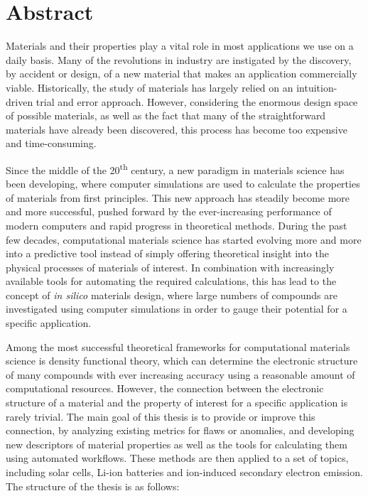 \chapter*{Abstract} \label{chapter:abstract}

Materials and their properties play a vital role in most applications we use on 
a daily basis. Many of the revolutions in industry are instigated by the 
discovery, by accident or design, of a new material that makes an application 
commercially viable. Historically, the study of materials has largely relied on 
an intuition-driven trial and error approach. However, considering the enormous 
design space of possible materials, as well as the fact that many of the 
straightforward materials have already been discovered, this process has become 
too expensive and time-consuming. 

Since the middle of the 20\textsuperscript{th} century, a new paradigm in 
materials science has been developing, where computer simulations are used to 
calculate the properties of materials from first principles. This new approach 
has steadily become more and more successful, pushed forward by the 
ever-increasing performance of modern computers and rapid progress in 
theoretical methods. During the past few decades, computational materials 
science has started evolving more and more into a predictive tool instead of 
simply offering theoretical insight into the physical processes of materials 
of interest. In combination with increasingly available tools for automating 
the required calculations, this has lead to the concept of \textit{in silico} 
materials design, where large numbers of compounds are investigated using 
computer simulations in order to gauge their potential for a specific application.

Among the most successful theoretical frameworks for computational materials 
science is density functional theory, which can determine the electronic 
structure of many compounds with ever increasing accuracy using a reasonable 
amount of computational resources. However, the connection between the 
electronic structure of a material and the property of interest for a specific 
application is rarely trivial. The main goal of this thesis is to provide or 
improve this connection, by analyzing existing metrics for flaws or anomalies, 
and developing new descriptors of material properties as well as the tools for 
calculating them using automated workflows. These methods are then applied to 
a set of topics, including solar cells, Li-ion batteries and ion-induced 
secondary electron emission. The structure of the thesis is as follows:

